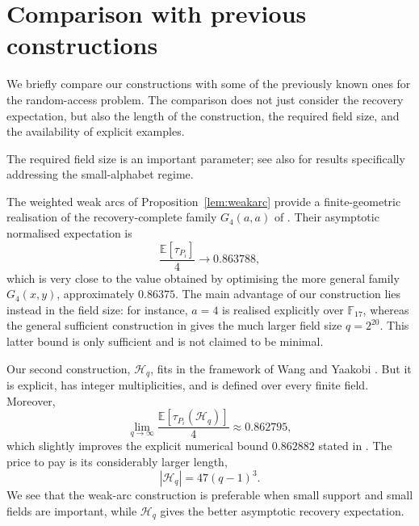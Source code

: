 \documentclass{article}
\newcommand{\F}{\mathbb{F}}
\newcommand{\E}{\mathbb{E}}
\begin{document}
{

\section{Comparison with previous constructions}
\label{sec:comparison}
We briefly compare our constructions with some of the previously known ones for the random-access problem. The comparison does not just consider the recovery expectation, but also the length of the construction, the required field size, and the availability of explicit examples.

The required field size is an important parameter; see
also \cite{BertuzzoRavagnaniYaakobi2025} for results specifically
addressing the small-alphabet regime. 

The weighted weak arcs of Proposition~\ref{lem:weakarc} provide a
finite-geometric realisation of the recovery-complete family $G_4(a,a)$
of \cite{BoruchovskyEtAl2026}. Their asymptotic normalised expectation is
\[
\frac{\E[\tau_{P_i}]}4\longrightarrow 0.863788,
\]
which is very close to the value obtained by optimising the more general
family $G_4(x,y)$, approximately $0.86375$. The main advantage of our
construction lies instead in the field size: for instance, $a=4$ is
realised explicitly over $\F_{17}$, whereas the general sufficient
construction in \cite{BoruchovskyEtAl2026} gives the much larger field
size $q=2^{20}$. This latter bound is only sufficient and is not claimed
to be minimal.


Our second construction, $\mathcal H_q$, fits in the framework of Wang and Yaakobi \cite{WangYaakobi2026}. But it is explicit, has integer multiplicities, and is defined over every finite field. Moreover,
\[
\lim_{q\to\infty}\frac{\E[\tau_{P_i}(\mathcal H_q)]}{4}
\approx0.862795,
\]
which slightly improves the explicit numerical bound $0.862882$ stated in \cite{WangYaakobi2026}. The price to pay is its considerably larger length,
\[
|\mathcal H_q|=47(q-1)^3.
\]
We see that the weak-arc construction is preferable when small support and small fields are important, while $\mathcal H_q$ gives the better asymptotic recovery expectation.

}
\end{document}
